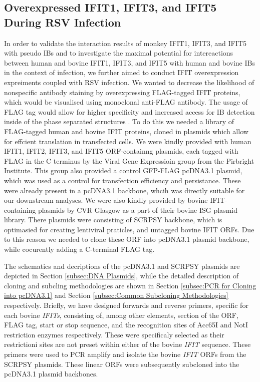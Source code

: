 \subsection{Overexpressed IFIT1, IFIT3, and IFIT5 During RSV Infection} \label{subsec:Overexpressed IFIT1, IFIT3, and IFIT5 During RSV Infection}
In order to validate the interaction results of monkey IFIT1, IFIT3, and IFIT5 with pseudo IBs and to investigate the maximal potential for intereactions between human and bovine IFIT1, IFIT3, and IFIT5 with human and bovine IBs in the context of infection, we further aimed to conduct IFIT overexpression expreiments coupled with RSV infection. We wanted to decrease the likelihood of nonspecific antibody staining by overexpressing FLAG-tagged IFIT proteins, which would be visualised using monoclonal anti-FLAG antibody. The usage of FLAG tag would allow for higher specificity and increased access for IB detection inside of the phase separated structures \cite{Munro1984Use70.}. To do this we needed a library of FLAG-tagged human and bovine IFIT proteins, cloned in plasmids which allow for effcient translation in transfected cells. We were kindly provided with human IFIT1, IFIT2, IFIT3, and IFIT5 ORF-containng plasmids, each tagged with FLAG in the C terminus by the Viral Gene Expressioin group from the Pirbright Institute. This group also provided a control GFP-FLAG pcDNA3.1 plasmid, which was used as a control for transfection efficiency and persistance. These were already present in a  pcDNA3.1 backbone, whcih was directly suitable for our downstream analyses. We were also kindly provided by bovine IFIT-containing plasmids by CVR Glasgow as a part of their bovine ISG plasmid library. There plasmids were consisting of SCRPSY backbone, which is optimasied for creating lentiviral praticles, and untagged bovine IFIT ORFs. Due to this reason we needed to clone these ORF into pcDNA3.1 plasmid backbone, while cocurently adding a C-terminal FLAG tag.

The schematics and decriptions of the pcDNA3.1 and SCRPSY plasmids are depicted in Section \ref{subsec:DNA Plasmids}, while the detailed description of cloning and subcling methodologies are shown in Section \ref{subsec:PCR for Cloning into pcDNA3.1} and Section \ref{subsec:Common Subcloning Methodologies} respectively. Briefly, we have designed forwards and reverse primers, specific for each bovine \textit{IFITs}, consisting of, among other elements, section of the ORF, FLAG tag, start or stop sequence, and the recognition sites of Acc65I and NotI restriction enzymes respectively. These were specificaly selected as their restrictioni sites are not preset within either of the bovine \textit{IFIT} sequence. These primers were used to PCR amplify and isolate the bovine \textit{IFIT} ORFs from the SCRPSY plasmids. These linear ORFs were subsequently subcloned into the pcDNA3.1 plasmid backbones.

